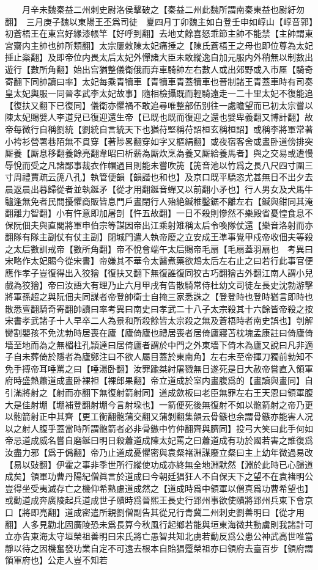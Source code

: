 　　月辛未魏秦益二州刺史尉洛侯擊破之【秦益二州此魏所謂南秦東益也尉紆勿翻】　三月庚子魏以東陽王丕爲司徒　夏四月丁卯魏主如白登壬申如崞山【崞音郭】　初蒼梧王在東宫好緣漆帳竿【好呼到翻】去地丈餘喜怒乖節主帥不能禁【主帥謂東宮齋内主帥也帥所類翻】太宗屢敕陳太妃痛捶之【陳氏蒼梧王之母也即位尊為太妃捶止橤翻】及即帝位内畏太后太妃外憚諸大臣未敢縱逸自加元服内外稍無以制數出遊行【數所角翻】始出宫猶整儀衛俄而弃車騎帥左右數人或出郊野或入市㕓【騎奇寄翻下同帥讀曰率】太妃每乘青犢車【青犢車青蓋犢車也晉制諸王青蓋車時有司奏皇太妃輿服一同晉孝武李太妃故事】隨相檢攝既而輕騎遠走一二十里太妃不復能追【復扶又翻下已復同】儀衛亦懼禍不敢追尋唯整部伍别往一處瞻望而已初太宗嘗以陳太妃賜嬖人李道兒已復迎還生帝【已既也既而復迎之還也嬖卑義翻又博計翻】故帝每微行自稱劉統【劉統自言統天下也猶苻堅稱苻詔桓玄稱桓詔】或稱李將軍常著小袴衫營署巷陌無不貫穿【著陟畧翻穿如字又樞絹翻】或夜宿客舍或晝卧道傍排突厮養【厮息移翻養餘亮翻韋昭曰析薪為厮炊烹為養又厮給養馬者】與之交易或遭慢辱悅而受之凡諸鄙事裁衣作帽過目則能未嘗吹箎【箎音池以竹爲之長八尺四寸圍三寸周禮賈疏云箎八孔】執管便韻【韻諧也和也】及京口既平驕恣尤甚無日不出夕去晨返晨出暮歸從者並執鋋矛【從才用翻鋋音蟬又以前翻小矛也】行人男女及犬馬牛驢逢無免者民間擾懼商販皆息門戶晝閉行人殆絶鍼椎鑿鋸不離左右【鍼與鉗同其淹翻離力智翻】小有忤意即加屠剖【忤五故翻】一日不殺則慘然不樂殿省憂惶食息不保阮佃夫與直閣將軍申伯宗等謀因帝出江乘射雉稱太后令喚隊仗還【樂音洛射而亦翻隊有隊主副仗有仗主副】閉城門遣人執帝廢之立安成王凖事覺甲戍帝收佃夫等殺之太后數訓戒帝【數所角翻】帝不悅會端午太后賜帝毛扇【毛扇蓋羽扇也　考異曰宋略作太妃賜今從宋書】帝嫌其不華令太醫煮藥欲鴆太后左右止之曰若行此事官便應作孝子豈復得出入狡獪【復扶又翻下無復誰復同狡古巧翻獪古外翻江南人謂小兒戲為狡獪】帝曰汝語大有理乃止六月甲戌有告散騎常侍杜幼文司徒左長史沈勃游擊將軍孫超之與阮佃夫同謀者帝登帥衛士自掩三家悉誅之【登登時也登時猶言即時也散悉亶翻騎奇寄翻帥讀曰率考異曰南史曰孝武二十八子太宗殺其十六餘皆帝殺之按宋書孝武諸子十人早卒二人為景和所殺餘皆太宗殺之無及蒼梧時者南史誤也】刳解臠割嬰孩不免沈勃時居喪在廬【廬倚廬也禮居喪者居倚廬寢苫枕塊孟康註曰倚廬倚墻至地而為之無楣柱孔頴達曰居倚廬者謂於中門之外東墻下倚木為廬又說曰凡非適子自未葬倚於隱者為廬鄭注曰不欲人屬目蓋於東南角】左右未至帝揮刀獨前勃知不免手搏帝耳唾罵之曰【唾湯卧翻】汝罪踰桀紂屠戮無日遂死是日大赦帝嘗直入領軍府時盛熱蕭道成晝卧裸袒【裸郎果翻】帝立道成於室内畫腹爲的【畫讀與畫同】自引滿將射之【射而亦翻下無復射箭射同】道成歛板曰老臣無罪左右王天恩曰領軍腹大是佳射堋【堋補登翻射堋今言射垜也】一箭便死後無復射不如以骲箭射之帝乃更以骲箭射正中其齊【更工衡翻骲蒲交翻又蒲剝翻集韻云骨鏃也余謂骨鏃亦能害人况以之射人腹乎蓋當時所謂骲箭者必非骨鏃中竹仲翻齊與臍同】投弓大笑曰此手何如帝忌道成威名嘗自磨鋋曰明日殺蕭道成陳太妃罵之曰蕭道成有功於國若害之誰復爲汝盡力邪【爲于僞翻】帝乃止道成憂懼密與袁粲褚淵謀廢立粲曰主上幼年微過易改【易以䜴翻】伊霍之事非季世所行縱使功成亦終無全地淵默然【淵於此時已心歸道成矣】領軍功曹丹陽紀僧眞言於道成曰今朝廷猖狂人不自保天下之望不在袁褚明公豈得坐受夷滅存亡之機仰希熟慮道成然之【道成時爲中領軍以僧真爲功曹希望也】或勸道成奔廣陵起兵道成世子賾時爲晉熙王長史行郢州事欲使賾將郢州兵東下會京口【將即亮翻】道成密遣所親劉僧副告其從兄行青冀二州刺史劉善明曰【從才用翻】人多見勸北固廣陵恐未爲長算今秋風行起鄉若能與垣東海微共動虜則我諸計可立亦告東海太守垣榮祖善明曰宋氏將亡愚智共知北虜若動反爲公患公神武高世唯當靜以待之因機奮發功業自定不可遠去根本自貽猖蹷榮祖亦曰領府去臺百步【領府謂領軍府也】公走人豈不知若